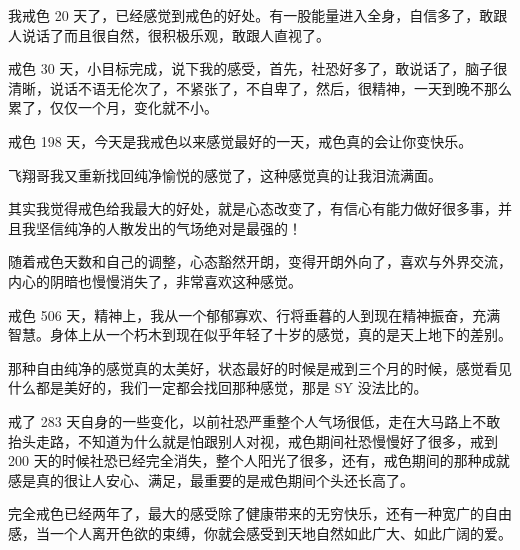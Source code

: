 \begin{case}
    我戒色 20 天了，已经感觉到戒色的好处。有一股能量进入全身，自信多了，敢跟人说话了而且很自然，很积极乐观，敢跟人直视了。
\end{case}

\begin{case}
    戒色 30 天，小目标完成，说下我的感受，首先，社恐好多了，敢说话了，脑子很清晰，说话不语无伦次了，不紧张了，不自卑了，然后，很精神，一天到晚不那么累了，仅仅一个月，变化就不小。
\end{case}

\begin{case}
    戒色 198 天，今天是我戒色以来感觉最好的一天，戒色真的会让你变快乐。
\end{case}

\begin{case}
    飞翔哥我又重新找回纯净愉悦的感觉了，这种感觉真的让我泪流满面。
\end{case}

\begin{case}
    其实我觉得戒色给我最大的好处，就是心态改变了，有信心有能力做好很多事，并且我坚信纯净的人散发出的气场绝对是最强的！
\end{case}

\begin{case}
    随着戒色天数和自己的调整，心态豁然开朗，变得开朗外向了，喜欢与外界交流，内心的阴暗也慢慢消失了，非常喜欢这种感觉。
\end{case}

\begin{case}
    戒色 506 天，精神上，我从一个郁郁寡欢、行将垂暮的人到现在精神振奋，充满智慧。身体上从一个朽木到现在似乎年轻了十岁的感觉，真的是天上地下的差别。
\end{case}

\begin{case}
    那种自由纯净的感觉真的太美好，状态最好的时候是戒到三个月的时候，感觉看见什么都是美好的，我们一定都会找回那种感觉，那是 SY 没法比的。
\end{case}

\begin{case}
    戒了 283 天自身的一些变化，以前社恐严重整个人气场很低，走在大马路上不敢抬头走路，不知道为什么就是怕跟别人对视，戒色期间社恐慢慢好了很多，戒到 200 天的时候社恐已经完全消失，整个人阳光了很多，还有，戒色期间的那种成就感是真的很让人安心、满足，最重要的是戒色期间个头还长高了。
\end{case}

\begin{case}
    完全戒色已经两年了，最大的感受除了健康带来的无穷快乐，还有一种宽广的自由感，当一个人离开色欲的束缚，你就会感受到天地自然如此广大、如此广阔的爱。
\end{case}

